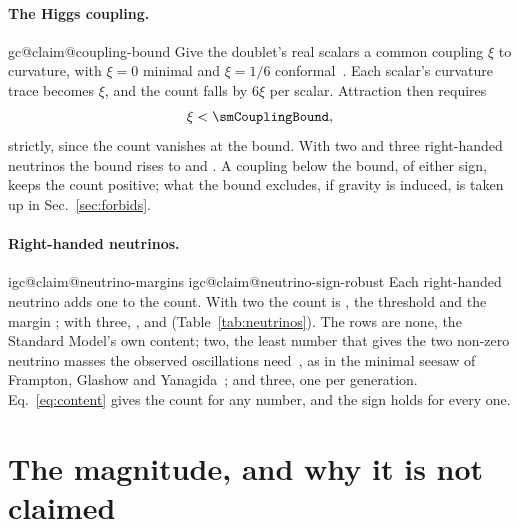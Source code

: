\documentclass[aps,prd,reprint,amsmath,amssymb,superscriptaddress,nofootinbib]{revtex4-2}
\makeatletter
\newcommand{\claim}[1]{\expandafter\xdef\csname igc@claim@#1\endcsname{\thesection}}
\makeatother
\begin{document}
\paragraph{The Higgs coupling.}
\claim{coupling-bound}%
Give the doublet's \smScalars{} real scalars a common coupling $\xi$ to curvature,
with $\xi=0$ minimal and $\xi=1/6$ conformal~\cite{BirrellDavies1982}. Each scalar's
curvature trace becomes $\xi$, and the count falls by $6\xi$ per scalar. Attraction
then requires
\begin{equation}
\xi<\smCouplingBound ,
\end{equation}
strictly, since the count vanishes at the bound. With two and three right-handed
neutrinos the bound rises to \nuTwoCouplingBound{} and \nuThreeCouplingBound. A
coupling below the bound, of either sign, keeps the count positive; what the bound
excludes, if gravity is induced, is taken up in Sec.~\ref{sec:forbids}.

\paragraph{Right-handed neutrinos.}
\claim{neutrino-margins}%
\claim{neutrino-sign-robust}%
Each right-handed neutrino adds one to the count. With two the count is \nuTwoNet,
the threshold \nuTwoThreshold{} and the margin \nuTwoMarginPct; with three,
\nuThreeNet, \nuThreeThreshold{} and \nuThreeMarginPct{} (Table~\ref{tab:neutrinos}).
The rows are none, the Standard Model's own content; two, the least number that gives
the two non-zero neutrino masses the observed oscillations need~\cite{PDG2024}, as in
the minimal seesaw of Frampton, Glashow and Yanagida~\cite{FramptonGlashowYanagida2002};
and three, one per generation. Eq.~\eqref{eq:content} gives the count for any number,
and the sign holds for every one.

\begin{table}
\caption{The Standard Model with $\nu_R$ right-handed neutrinos added: the count, the
threshold weighting, the margin, and the bound on the Higgs doublet's common curvature
coupling.}
\label{tab:neutrinos}
\centering

\end{table}

\section{The magnitude, and why it is not claimed}
\label{sec:magnitude}
\end{document}
